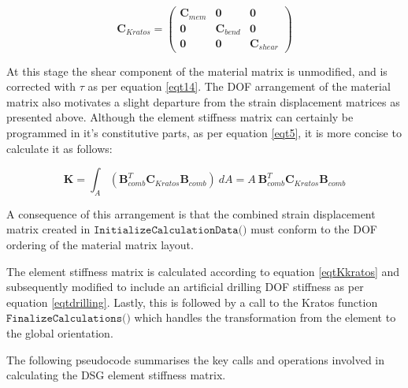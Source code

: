 \begin{equation} 
\mathbf{C}_{Kratos} =  
\begin{pmatrix}
	\mathbf{C}_{mem} & \mathbf{0} & \mathbf{0} \\
	\mathbf{0} & \mathbf{C}_{bend} & \mathbf{0} \\
	\mathbf{0} & 	\mathbf{0} & \mathbf{C}_{shear}
\end{pmatrix}
\label{eqtCkratos}
\end{equation} 

At this stage the shear component of the material matrix is unmodified, and is corrected with $\tau$ as per equation \eqref{eqt14}. The DOF arrangement of the material matrix also motivates a slight departure from the strain displacement matrices as presented above. Although the element stiffness matrix can certainly be programmed in it's constitutive parts, as per equation \eqref{eqt5}, it is more concise to calculate it as follows:

\begin{equation} 
\mathbf{K} = \int_A  (\mathbf{B}_{comb}^T \mathbf{C}_{Kratos} \mathbf{B}_{comb} )\ dA
= A\  \mathbf{B}_{comb}^T \mathbf{C}_{Kratos} \mathbf{B}_{comb} 
\label{eqtKkratos}
\end{equation}

A consequence of this arrangement is that the combined strain displacement matrix created in $\texttt{InitializeCalculationData()}$ must conform to the DOF ordering of the material matrix layout.

The element stiffness matrix is calculated according to equation \eqref{eqtKkratos} and subsequently modified to include an artificial drilling DOF stiffness as per equation \eqref{eqtdrilling}. Lastly, this is followed by a call to the Kratos function $\texttt{FinalizeCalculations()}$ which handles the transformation from the element to the global orientation.

The following pseudocode summarises the key calls and operations involved in calculating the DSG element stiffness matrix.

